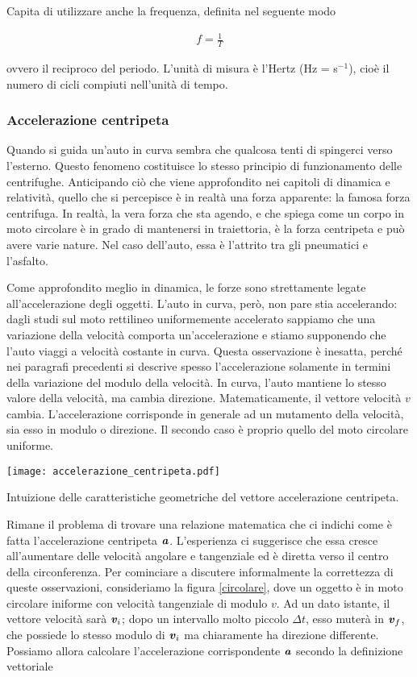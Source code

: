 \noindent Capita di utilizzare anche la frequenza, definita nel seguente
modo

\begin{align}
    f = \frac{1}{T}
\end{align}

\noindent ovvero il reciproco del periodo. L'unità di misura è l'Hertz
(Hz = s$^{-1}$), cioè il numero di cicli compiuti nell'unità di tempo.

\subsubsection*{Accelerazione centripeta}
Quando si guida un'auto in curva sembra che qualcosa tenti di spingerci
verso l'esterno. Questo fenomeno costituisce lo stesso principio di
funzionamento delle centrifughe. Anticipando ciò che viene approfondito
nei capitoli di dinamica e relatività, quello che si percepisce è in
realtà una forza apparente: la famosa forza centrifuga. In realtà,
la vera forza che sta agendo, e che spiega come un corpo in moto circolare
è in grado di mantenersi in traiettoria, è la forza centripeta e può
avere varie nature. Nel caso dell'auto, essa è l'attrito tra gli pneumatici
e l'asfalto.

Come approfondito meglio in dinamica, le forze sono
strettamente legate all'accelerazione degli oggetti. L'auto in curva,
però, non pare stia accelerando: dagli studi sul moto rettilineo
uniformemente accelerato sappiamo che una variazione della velocità
comporta un'accelerazione e stiamo supponendo che l'auto viaggi a velocità
costante in curva. Questa osservazione è inesatta, perché nei
paragrafi precedenti si descrive spesso l'accelerazione solamente in
termini della variazione del modulo della velocità. In curva, l'auto
mantiene lo stesso valore della velocità, ma cambia direzione.
Matematicamente, il vettore velocità $v$ cambia. L'accelerazione
corrisponde in generale ad un mutamento della velocità, sia esso in
modulo o direzione. Il secondo caso è proprio quello del moto circolare
uniforme.

\begin{marginfigure}
    \centering
    \texttt{[image: accelerazione\_centripeta.pdf]}
    \caption{Intuizione delle caratteristiche geometriche del vettore accelerazione centripeta.}
    \label{circolare}
\end{marginfigure}

Rimane il problema di trovare una relazione matematica che ci indichi
come è fatta l'accelerazione centripeta $\textbf{\textit{a}}$. L'esperienza
ci suggerisce che essa cresce all'aumentare delle velocità angolare
e tangenziale ed è diretta verso il centro della circonferenza.
Per cominciare a discutere informalmente la correttezza di queste
osservazioni, consideriamo la figura \ref{circolare}, dove un oggetto è in moto
circolare iniforme con velocità tangenziale di modulo $v$. Ad un
dato istante, il vettore velocità sarà $\textbf{\textit{v}}_i$; dopo un
intervallo molto piccolo $\Delta t$, esso muterà in $\textbf{\textit{v}}_f$,
che possiede
lo stesso modulo di $\textbf{\textit{v}}_i$ ma chiaramente ha direzione
differente. Possiamo allora calcolare l'accelerazione corrispondente
$\textbf{\textit{a}}$ secondo la definizione vettoriale

